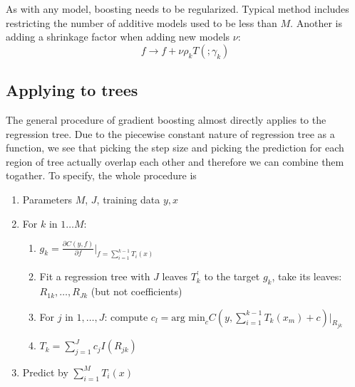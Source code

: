 \documentclass{article}
\begin{document}
As with any model, boosting needs to be regularized. Typical method includes restricting the number of additive models used to be less than $M$. Another is adding a shrinkage factor when adding new models $\nu$:
\[
f\rightarrow f+\nu\rho_kT( ;\gamma_k)
\]
\subsection{Applying to trees}
The general procedure of gradient boosting almost directly applies to the regression tree. Due to the piecewise constant nature of regression tree as a function, we see that picking the step size and picking the prediction for each region of tree actually overlap each other and therefore we can combine them togather. To specify, the whole procedure is
\begin{enumerate}
\item
Parameters $M$, $J$, training data $y,x$
\item
For $k$ in $1\dots M$:
\begin{enumerate}
\item
$g_k=\frac{\partial C(y,f)}{\partial f}|_{f=\sum_{i=1}^{k-1}T_i(x)}$
\item
Fit a regression tree with $J$ leaves $T_k^\prime$ to the target $g_k$, take its leaves: $R_{1k},\dots, R_{Jk}$ (but not coefficients)
\item
For $j$ in $1,\dots,J$: compute $c_l=\textrm{arg min}_{c}C(y,\sum_{i=1}^{k-1}T_k(x_m)+c)|_{R_{jk}}$
\item
$T_k=\sum_{j=1}^Jc_jI(R_{jk})$
\end{enumerate}
\item
Predict by $\sum_{i=1}^MT_i(x)$
\end{enumerate}
\end{document}
